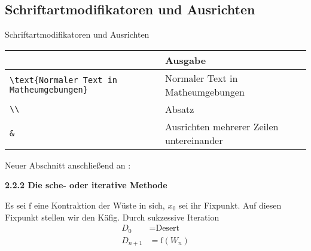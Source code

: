 \documentclass["WS\space 16-17\space -\space LaTeX-Kurs\space -\space Praesentation\space -\space 1.tex"]{subfiles}
\begin{document}
\subsection{Schriftartmodifikatoren und Ausrichten}
\begin{frame}[c]
	\begin{center}
		\large Schriftartmodifikatoren und Ausrichten
	\end{center}
\end{frame}
\begin{frame}[fragile]
	\begin{center}
		\begin{tabular}{ll}
			\toprule
			\color{math-cmd}{Mathe}\color{black}{-Befehl}													&	Ausgabe										\\ \midrule
			\lstinline|\text{Normaler Text in Matheumgebungen}|		&	Normaler Text in Matheumgebungen			\\
			\lstinline|\\|											&	Absatz										\\
			\lstinline|&|											&	Ausrichten mehrerer Zeilen untereinander	\\
			\bottomrule
		\end{tabular}
	\end{center}
	\pause\btVFill
	\Aufgabee
	Neuer Abschnitt anschließend an :
	\begin{outputbox}
		{\large\textbf{2.2.2 Die sche- oder iterative Methode}}
		
		Es sei $\mathrm{f}$ eine Kontraktion der Wüste in sich, $x_0$ sei ihr Fixpunkt. Auf diesen Fixpunkt stellen wir den Käfig. Durch sukzessive Iteration
		\begin{align}
		    D_0 	&= \text{Desert} \\
	        D_{n+1} &= \mathrm{f}(W_n)
		\end{align}
	\end{outputbox}
	\vspace{0.3cm}
\end{frame}
\end{document}
